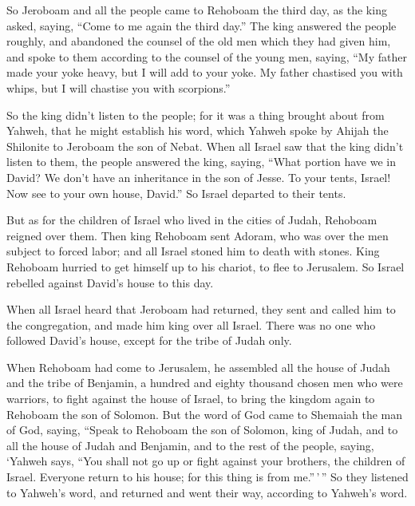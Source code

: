  So Jeroboam and all the people came to Rehoboam the
third day, as the king asked, saying, ``Come to me again the third
day.''  The king answered the people roughly, and
abandoned the counsel of the old men which they had given him,
 and spoke to them according to the counsel of the young
men, saying, ``My father made your yoke heavy, but I will add to your
yoke. My father chastised you with whips, but I will chastise you with
scorpions.''

 So the king didn't listen to the people; for it was a
thing brought about from Yahweh, that he might establish his word, which
Yahweh spoke by Ahijah the Shilonite to Jeroboam the son of Nebat.
 When all Israel saw that the king didn't listen to them,
the people answered the king, saying, ``What portion have we in David?
We don't have an inheritance in the son of Jesse. To your tents, Israel!
Now see to your own house, David.'' So Israel departed to their tents.

 But as for the children of Israel who lived in the
cities of Judah, Rehoboam reigned over them.  Then king
Rehoboam sent Adoram, who was over the men subject to forced labor; and
all Israel stoned him to death with stones. King Rehoboam hurried to get
himself up to his chariot, to flee to Jerusalem.  So
Israel rebelled against David's house to this day.

 When all Israel heard that Jeroboam had returned, they
sent and called him to the congregation, and made him king over all
Israel. There was no one who followed David's house, except for the
tribe of Judah only.

 When Rehoboam had come to Jerusalem, he assembled all
the house of Judah and the tribe of Benjamin, a hundred and eighty
thousand chosen men who were warriors, to fight against the house of
Israel, to bring the kingdom again to Rehoboam the son of Solomon.
 But the word of God came to Shemaiah the man of God,
saying,  ``Speak to Rehoboam the son of Solomon, king of
Judah, and to all the house of Judah and Benjamin, and to the rest of
the people, saying,  `Yahweh says, ``You shall not go up
or fight against your brothers, the children of Israel. Everyone return
to his house; for this thing is from me.''\,'\,'' So they listened to
Yahweh's word, and returned and went their way, according to Yahweh's
word.

